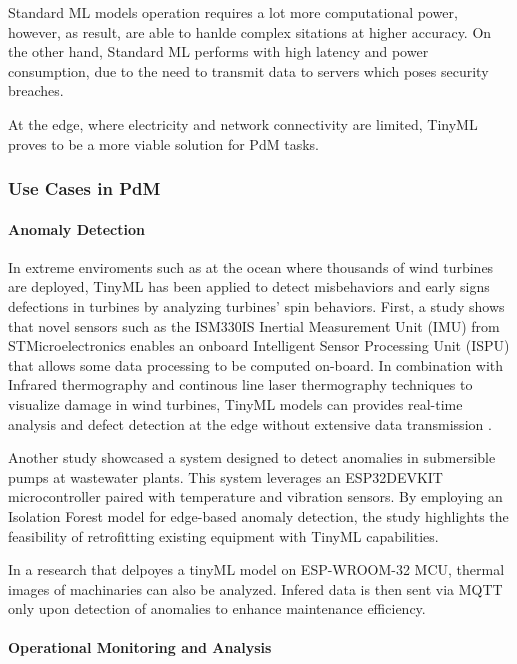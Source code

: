 \documentclass[twocolumn]{article}
\begin{document}
Standard ML models operation requires a lot more computational power, however, as result, are able to hanlde complex sitations at higher accuracy. On the other hand, Standard ML performs with high latency and power consumption, due to the need to transmit data to servers which poses security breaches.

At the edge, where electricity and network connectivity are limited, TinyML proves to be a more viable solution for PdM tasks. 

\subsubsection{Use Cases in PdM}

\paragraph{Anomaly Detection}

In extreme enviroments such as at the ocean where thousands of wind turbines are deployed, TinyML has been applied to detect misbehaviors and early signs defections in turbines by analyzing turbines' spin behaviors. First, a study shows that novel sensors such as the ISM330IS Inertial Measurement Unit (IMU) from STMicroelectronics enables an onboard Intelligent Sensor Processing Unit (ISPU) that allows some data processing to be computed on-board. In combination with Infrared thermography and continous line laser thermography techniques to visualize damage in wind turbines, TinyML models can provides real-time analysis and defect detection at the edge without extensive data transmission \cite{rabbi_novel_nodate}. 

Another study showcased a system designed to detect anomalies in submersible pumps at wastewater plants. This system leverages an ESP32DEVKIT microcontroller paired with temperature and vibration sensors. By employing an Isolation Forest model for edge-based anomaly detection, the study highlights the feasibility of retrofitting existing equipment with TinyML capabilities.\cite{antonini_tinyml_2022}

In a research that delpoyes a tinyML model on ESP-WROOM-32 MCU, thermal images of machinaries can also be analyzed. Infered data is then sent via MQTT only upon detection of anomalies to enhance maintenance efficiency. \cite{oliveira_edge_2022}

\paragraph{Operational Monitoring and Analysis}
\end{document}
